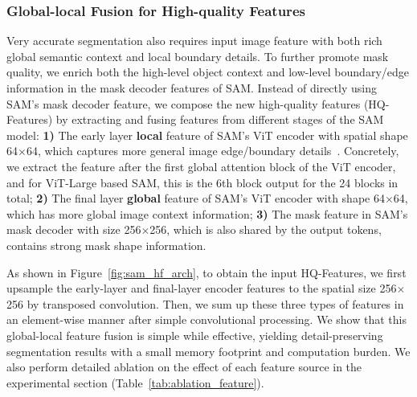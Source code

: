 \subsubsection{Global-local Fusion for High-quality Features}

Very accurate segmentation also requires input image feature with both rich global semantic context and local boundary details. To further promote mask quality, we enrich both the high-level object context and low-level boundary/edge information in the mask decoder features of SAM. Instead of directly using SAM's mask decoder feature, we compose the new high-quality features (HQ-Features) by extracting and fusing features from different stages of the SAM model: \textbf{1)} The early layer \textbf{local} feature of SAM's ViT encoder with spatial shape 64$\times$64, which captures more general image edge/boundary details~\cite{ghiasi2022vision}. Concretely, we extract the feature after the first global attention block of the ViT encoder, and for ViT-Large based SAM, this is the 6th block output for the 24 blocks in total;
\textbf{2)} The final layer \textbf{global} feature of SAM's ViT encoder with shape 64$\times$64, which has more global image context information;
\textbf{3)} The mask feature in SAM's mask decoder with size 256$\times$256, which is also shared by the output tokens, contains strong mask shape information.

As shown in Figure~\ref{fig:sam_hf_arch}, to obtain the input HQ-Features, we first upsample the early-layer and final-layer encoder features to the spatial size 256$\times$256 by transposed convolution. Then, we sum up these three types of features in an element-wise manner after simple convolutional processing. We show that this global-local feature fusion is simple while effective, yielding detail-preserving segmentation results with a small memory footprint and computation burden. We also perform detailed ablation on the effect of each feature source in the experimental section (Table~\ref{tab:ablation_feature}).

